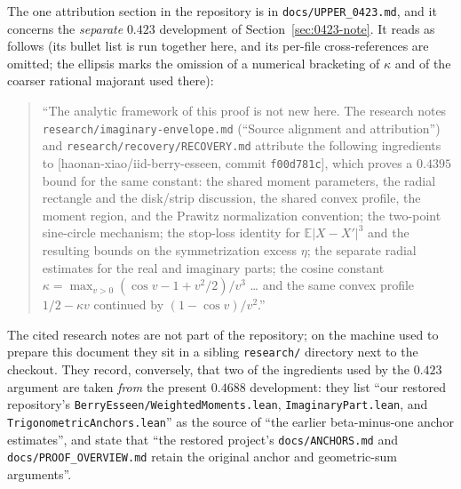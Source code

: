 \documentclass[10pt,a4paper]{article}
\theoremstyle{plain}
\theoremstyle{definition}
\newcommand{\E}{\mathbb{E}}
\newcommand{\file}[1]{\texttt{#1}}
\begin{document}
The one attribution section in the repository is in
\file{docs/UPPER\_0423.md}, and it concerns the \emph{separate} $0.423$
development of Section~\ref{sec:0423-note}. It reads as follows (its bullet list
is run together here, and its per-file cross-references are omitted; the
ellipsis marks the omission of a numerical bracketing of $\kappa$ and of the
coarser rational majorant used there):
\begin{quote}\small\sloppy
``The analytic framework of this proof is not new here. The research notes
\file{research/imaginary-envelope.md} (``Source alignment and attribution'')
and \file{research/recovery/RECOVERY.md} attribute the following ingredients to
[haonan-xiao/iid-berry-esseen, commit \texttt{f00d781c}], which proves a
$0.4395$ bound for the same constant: the shared moment parameters, the radial
rectangle and the disk/strip discussion, the shared convex profile, the moment
region, and the Prawitz normalization convention; the two-point sine-circle
mechanism; the stop-loss identity for $\E|X-X'|^3$ and the resulting bounds on
the symmetrization excess $\eta$; the separate radial estimates for the real
and imaginary parts; the cosine constant
$\kappa=\max_{v>0}(\cos v-1+v^2/2)/v^3$ \dots{} and the same convex profile
$1/2-\kappa v$ continued by $(1-\cos v)/v^2$.''
\end{quote}
The cited research notes are not part of the repository; on the machine used to
prepare this document they sit in a sibling \file{research/} directory next to
the checkout. They record, conversely, that two of the ingredients used by the
$0.423$ argument are taken \emph{from} the present $0.4688$ development: they
list ``our restored repository's \file{BerryEsseen/WeightedMoments.lean},
\file{ImaginaryPart.lean}, and \file{TrigonometricAnchors.lean}'' as the source
of ``the earlier beta-minus-one anchor estimates'', and state that ``the
restored project's \file{docs/ANCHORS.md} and \file{docs/PROOF\_OVERVIEW.md}
retain the original anchor and geometric-sum arguments''.
\end{document}
